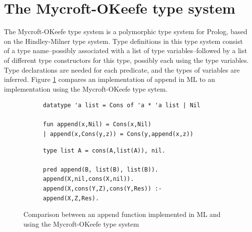 \documentclass[12pt,a4paper]{report}
\begin{document}

\section{The Mycroft-OKeefe type system}

The Mycroft-OKeefe type system \cite{mycroftTypes} is a polymorphic type system for Prolog, based on the Hindley-Milner type system. Type definitions in this type system consist of a type name--possibly associated with a list of type variables--followed by a list of different type constructors for this type, possibly each using the type variables. Type declarations are needed for each predicate, and the types of variables are inferred. Figure \ref{mlvsmyc} compares an implementation of append in ML to an implementation using the Mycroft-OKeefe type sytem.


\begin{figure}
\centering 
\small 

\begin{subfigure}{0.7\linewidth}
\begin{lstlisting}[frame=tb]
datatype 'a list = Cons of 'a * 'a list | Nil

fun append(x,Nil) = Cons(x,Nil)
| append(x,Cons(y,z)) = Cons(y,append(x,z))
\end{lstlisting}
\end{subfigure}

\begin{subfigure}{0.7\linewidth} \hspace{1em}
\begin{lstlisting}[frame=tb]
type list A = cons(A,list(A)), nil.

pred append(B, list(B), list(B)).
append(X,nil,cons(X,nil)).
append(X,cons(Y,Z),cons(Y,Res)) :- append(X,Z,Res).
\end{lstlisting}

\end{subfigure}

\WarningsOff
\captionsetup{type=lstlisting} 
\caption{Comparison between an append function implemented in ML and using the   Mycroft-OKeefe type system}
\label{mlvsmyc}
\end{figure}
\end{document}
